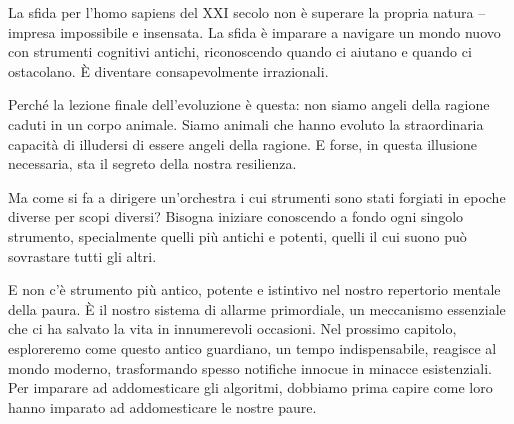 La sfida per l'homo sapiens del XXI secolo non è superare la propria natura – impresa impossibile e insensata. La sfida è imparare a navigare un mondo nuovo con strumenti cognitivi antichi, riconoscendo quando ci aiutano e quando ci ostacolano. È diventare consapevolmente irrazionali.

Perché la lezione finale dell'evoluzione è questa: non siamo angeli della ragione caduti in un corpo animale. Siamo animali che hanno evoluto la straordinaria capacità di illudersi di essere angeli della ragione. E forse, in questa illusione necessaria, sta il segreto della nostra resilienza.

Ma come si fa a dirigere un'orchestra i cui strumenti sono stati forgiati in epoche diverse per scopi diversi? Bisogna iniziare conoscendo a fondo ogni singolo strumento, specialmente quelli più antichi e potenti, quelli il cui suono può sovrastare tutti gli altri.

E non c'è strumento più antico, potente e istintivo nel nostro repertorio mentale della paura. È il nostro sistema di allarme primordiale, un meccanismo essenziale che ci ha salvato la vita in innumerevoli occasioni. Nel prossimo capitolo, esploreremo come questo antico guardiano, un tempo indispensabile, reagisce al mondo moderno, trasformando spesso notifiche innocue in minacce esistenziali. Per imparare ad addomesticare gli algoritmi, dobbiamo prima capire come loro hanno imparato ad addomesticare le nostre paure.



